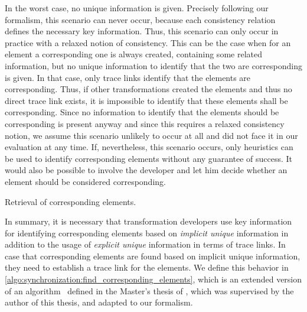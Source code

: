 In the worst case, no unique information is given.
Precisely following our formalism, this scenario can never occur, because each consistency relation defines the necessary key information.
Thus, this scenario can only occur in practice with a relaxed notion of consistency.
This can be the case when for an element a corresponding one is always created, containing some related information, but no unique information to identify that the two are corresponding is given.
In that case, only trace links identify that the elements are corresponding.
Thus, if other transformations created the elements and thus no direct trace link exists, it is impossible to identify that these elements shall be corresponding.
Since no information to identify that the elements should be corresponding is present anyway and since this requires a relaxed consistency notion, we assume this scenario unlikely to occur at all and did not face it in our evaluation at any time.
If, nevertheless, this scenario occurs, only heuristics can be used to identify corresponding elements without any guarantee of success.
It would also be possible to involve the developer and let him decide whether an element should be considered corresponding.

\begin{algorithm}
    
    \caption[Retrieval of corresponding elements]{Retrieval of corresponding elements.}
    \label{algo:synchronization:find_corresponding_elements}
\end{algorithm}

In summary, it is necessary that transformation developers use key information for identifying corresponding elements based on \emph{implicit unique} information in addition to the usage of \emph{explicit unique} information in terms of trace links.
In case that corresponding elements are found based on implicit unique information, they need to establish a trace link for the elements.
We define this behavior in \autoref{algo:synchronization:find_corresponding_elements}, which is an extended version of an algorithm~ defined in the Master's thesis of \citeauthor{saglam2020ma}, which was supervised by the author of this thesis, and adapted to our formalism.

